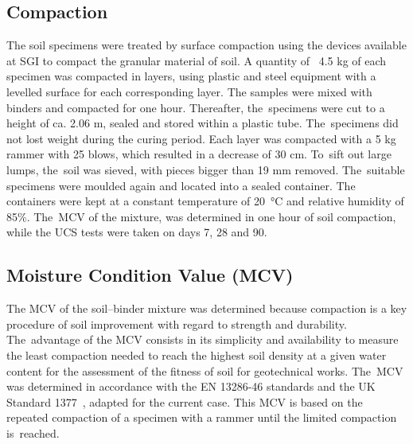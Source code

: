\documentclass[electronics,article,accept,pdftex,moreauthors]{Definitions/mdpi}
\begin{document}
\subsection{Compaction}
The {soil specimens} were treated by surface compaction using the {devices} available at SGI to compact the granular material of soil. A quantity of ~4.5 kg %
of each{ }specimen{ }was compacted in{ }layers, {using }plastic {and steel equipment with a levelled surface for each corresponding layer}. {The samples were mixed with binders and compacted for} one hour. {Thereafter}, the~specimens were cut to a height of ca. 2.06 m, sealed { }and stored within {a} plastic tube. The~specimens did not lost weight during the curing period. Each layer was compacted with a {5 kg} rammer with 25 blows, which resulted in {a} decrease of 30 cm. To~sift out large lumps, the~soil {was sieved, with pieces bigger} than 19 mm{ }removed. The~suitable specimens were{ }moulded again and {located} into a sealed container{. }The containers were {kept at a} constant temperature of 20~°C and{ }relative humidity of 85\%. The~MCV of the mixture, was determined in one hour of soil compaction, while the UCS tests were taken on days 7, 28 and 90{.} 

\subsection{Moisture Condition Value (MCV)}
The MCV of the soil--binder mixture was determined because compaction is a key procedure of soil improvement with regard to strength and durability. The~advantage of the MCV consists in its simplicity and availability to measure the {least} compaction{ }needed to{ reach }the {highest} soil density at a {given} water content for the {assessment of} the fitness of soil for geotechnical{ }works. The~MCV was determined in accordance with the EN 13286-46 standards and the UK Standard 1377~\cite{SIS2003,BIS}, adapted for the current case. This MCV is based on the repeated compaction of a specimen with a rammer until the limited compaction is~reached. 
\end{document}
